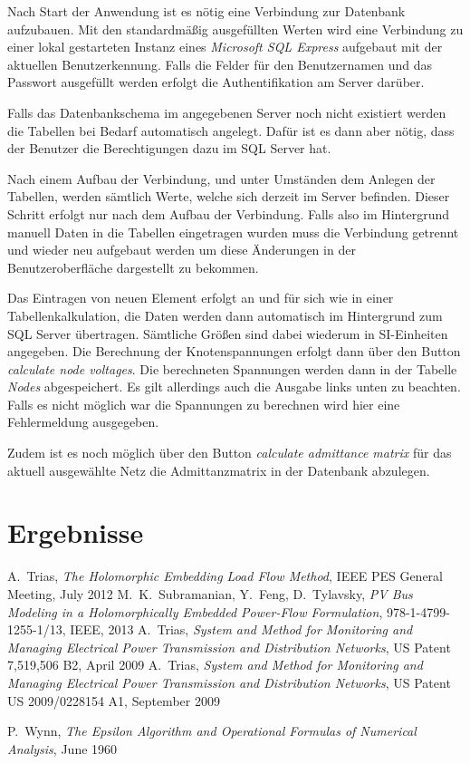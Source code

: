 \documentclass[12pt,a4paper]{article}
\begin{document}
	Nach Start der Anwendung ist es nötig eine Verbindung zur Datenbank aufzubauen. Mit den standardmäßig ausgefüllten Werten wird eine Verbindung zu einer lokal gestarteten Instanz eines \emph{Microsoft SQL Express} aufgebaut mit der aktuellen Benutzerkennung. Falls die Felder für den Benutzernamen und das Passwort ausgefüllt werden erfolgt die Authentifikation am Server darüber.
	
	Falls das Datenbankschema im angegebenen Server noch nicht existiert werden die Tabellen bei Bedarf automatisch angelegt. Dafür ist es dann aber nötig, dass der Benutzer die Berechtigungen dazu im SQL Server hat.
	
	Nach einem Aufbau der Verbindung, und unter Umständen dem Anlegen der Tabellen, werden sämtlich Werte, welche sich derzeit im Server befinden. Dieser Schritt erfolgt nur nach dem Aufbau der Verbindung. Falls also im Hintergrund manuell Daten in die Tabellen eingetragen wurden muss die Verbindung getrennt und wieder neu aufgebaut werden um diese Änderungen in der Benutzeroberfläche dargestellt zu bekommen.
	
	Das Eintragen von neuen Element erfolgt an und für sich wie in einer Tabellenkalkulation, die Daten werden dann automatisch im Hintergrund zum SQL Server übertragen. Sämtliche Größen sind dabei wiederum in SI-Einheiten angegeben. Die Berechnung der Knotenspannungen erfolgt dann über den Button \emph{calculate node voltages}. Die berechneten Spannungen werden dann in der Tabelle \emph{Nodes} abgespeichert. Es gilt allerdings auch die Ausgabe links unten zu beachten. Falls es nicht möglich war die Spannungen zu berechnen wird hier eine Fehlermeldung ausgegeben.
	
	Zudem ist es noch möglich über den Button \emph{calculate admittance matrix} für das aktuell ausgewählte Netz die Admittanzmatrix in der Datenbank abzulegen.
	
	\section{Ergebnisse}
	
	\begin{thebibliography}{1}
			A.~Trias, \emph{The Holomorphic Embedding Load Flow Method}, IEEE PES General Meeting, July 2012
			M.~K.~Subramanian, Y.~Feng, D.~Tylavsky, \emph{PV Bus Modeling in a Holomorphically Embedded Power-Flow Formulation}, 978-1-4799-1255-1/13, IEEE, 2013
			A.~Trias, \emph{System and Method for Monitoring and Managing Electrical Power Transmission and Distribution Networks}, US Patent 7,519,506 B2, April 2009
			A.~Trias, \emph{System and Method for Monitoring and Managing Electrical Power Transmission and Distribution Networks}, US Patent US 2009/0228154 A1, September 2009
			
			P.~Wynn, \emph{The Epsilon Algorithm and Operational Formulas of Numerical Analysis}, June 1960

	\end{thebibliography}
\end{document}
